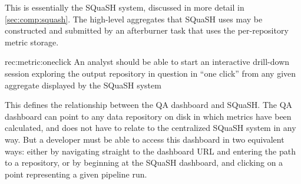 This is essentially the SQuaSH system, discussed in more detail in \ref{sec:comp:squash}.
The high-level aggregates that SQuaSH uses may be constructed and submitted by an afterburner task that uses the per-repository metric storage.

\begin{recommendation}
    {rec:metric:oneclick}
    {An analyst should be able to start an interactive drill-down session exploring the output repository in question in ``one click'' from any given aggregate displayed by the SQuaSH system}
\end{recommendation}

This defines the relationship between the QA dashboard and SQuaSH.
The QA dashboard can point to any data repository on disk in which metrics have been calculated, and does not have to relate to the centralized SQuaSH system in any way.
But a developer must be able to access this dashboard in two equivalent ways: either by navigating straight to the dashboard URL and entering the path to a repository, or by beginning at the SQuaSH dashboard, and clicking on a point representing a given pipeline run.
